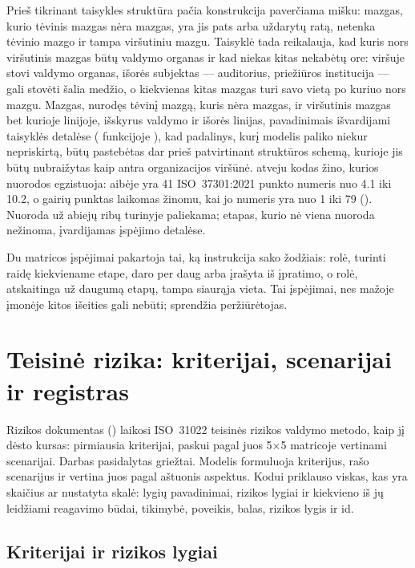 Prieš tikrinant taisykles struktūra pačia konstrukcija paverčiama mišku: mazgas, kurio tėvinis
mazgas nėra mazgas, yra jis pats arba uždarytų ratą, netenka tėvinio mazgo ir tampa viršutiniu mazgu.
Taisyklė  tada reikalauja, kad kuris nors viršutinis mazgas būtų valdymo organas
ir kad niekas kitas nekabėtų ore: viršuje stovi valdymo organas, išorės subjektas ---
auditorius, priežiūros institucija --- gali stovėti šalia medžio, o kiekvienas kitas mazgas turi
savo vietą po kuriuo nors mazgu. Mazgas, nurodęs tėvinį mazgą, kuris nėra mazgas, ir viršutinis
mazgas bet kurioje linijoje, išskyrus valdymo ir išorės linijas, pavadinimais išvardijami
taisyklės detalėse ( funkcijoje ), kad padalinys, kurį
modelis paliko niekur nepriskirtą, būtų pastebėtas dar prieš patvirtinant struktūros schemą,
kurioje jis būtų nubraižytas kaip antra organizacijos viršūnė.
 atveju kodas žino, kurios nuorodos egzistuoja: aibėje 
yra 41 ISO~37301:2021 punkto numeris nuo 4.1 iki 10.2, o gairių punktas laikomas žinomu, kai jo
numeris yra nuo 1 iki 79 (). Nuoroda už abiejų ribų turinyje
paliekama; etapas, kurio nė viena nuoroda nežinoma, įvardijamas įspėjimo detalėse.

Du matricos įspėjimai pakartoja tai, ką instrukcija sako žodžiais: rolė, turinti raidę
kiekviename etape, daro per daug arba įrašyta iš įpratimo, o rolė, atskaitinga už daugumą
etapų, tampa siaurąja vieta. Tai įspėjimai, nes mažoje įmonėje kitos išeities gali nebūti; sprendžia
peržiūrėtojas.


\section{Teisinė rizika: kriterijai, scenarijai ir registras}\label{sec:programme:risks}

Rizikos dokumentas () laikosi ISO~31022 teisinės rizikos valdymo
metodo, kaip jį dėsto kursas: pirmiausia kriterijai, paskui pagal juos 5×5 matricoje vertinami
scenarijai. Darbas pasidalytas griežtai. Modelis formuluoja kriterijus, rašo scenarijus ir
vertina juos pagal aštuonis aspektus. Kodui priklauso viskas, kas yra skaičius ar nustatyta
skalė: lygių pavadinimai, rizikos lygiai ir kiekvieno iš jų leidžiami reagavimo būdai,
tikimybė, poveikis, balas, rizikos lygis ir id.

\subsection{Kriterijai ir rizikos lygiai}

